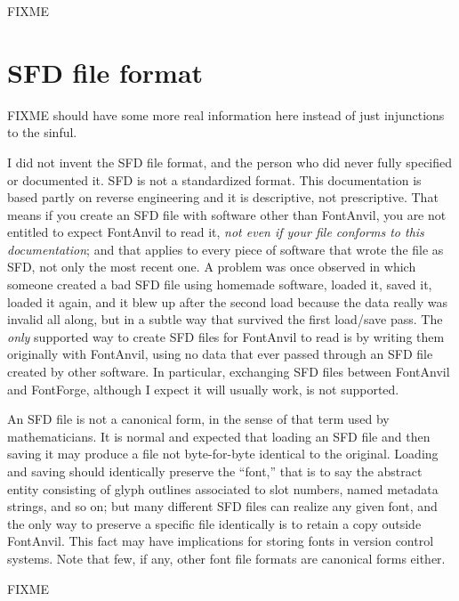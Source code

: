 \documentclass[11pt]{report}
\begin{document}
FIXME

\clearpage

\iffalse
\chapter{SFD file format}

FIXME should have some more real information here instead of just
injunctions to the sinful.

\begin{framed}
I did not invent the SFD file format, and the person who did never fully
specified or documented it.  SFD is not a standardized format.  This
documentation is based partly on reverse engineering and it is descriptive,
not prescriptive.  That means if you create an SFD file with software other
than FontAnvil, you are not entitled to expect FontAnvil to read it,
\emph{not even if your file conforms to this documentation}; and that
applies to every piece of software that wrote the file as SFD,
not only the most recent one.  A problem was once observed in which
someone created a bad SFD file using homemade software, loaded it, saved
it, loaded it again, and it blew up after the second load because the data
really was invalid all along, but in a subtle way that survived
the first load/save pass.  The \emph{only}
supported way to create SFD files for FontAnvil to read is by writing them
originally with FontAnvil, using no data that ever passed through an SFD
file created by other software.  In particular, exchanging SFD files
between FontAnvil and FontForge, although I expect it will usually work,
is not supported.
\end{framed}

An SFD file is not a canonical form, in the sense of that term used by
mathematicians.  It is normal and expected that loading an SFD file and then
saving it may produce a file not byte-for-byte identical to the original. 
Loading and saving should identically preserve the  ``font,'' that is to
say the abstract entity consisting of glyph outlines associated to slot
numbers, named metadata strings, and so on; but many different SFD files can
realize any given font, and the only way to preserve a specific file
identically is to retain a copy outside FontAnvil.  This fact may have
implications for storing fonts in version control systems.  Note that few,
if any, other font file formats are canonical forms either.

FIXME
\end{document}
